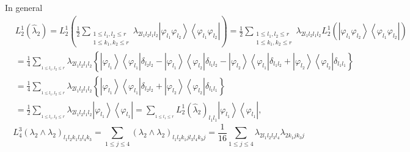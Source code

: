 \documentclass[aps,preprint]{revtex4}%
\begin{document}
In general%
\begin{align*}
&  L_{2}^{1}\left(  \hat{\lambda}_{2}\right)  =L_{2}^{1}\left(  \frac{1}%
{2}\sum_{\substack{1\leq l_{1},l_{2}\leq r\\1\leq k_{1},k_{2}\leq r}%
}\lambda_{2l_{1}l_{2}l_{1}l_{2}}\left\vert \varphi_{l_{1}}\varphi_{l_{2}%
}\right\rangle \left\langle \varphi_{l_{1}}\varphi_{l_{2}}\right\vert \right)
=\frac{1}{2}\sum_{\substack{1\leq l_{1},l_{2}\leq r\\1\leq k_{1},k_{2}\leq
r}}\lambda_{2l_{1}l_{2}l_{1}l_{2}}L_{2}^{1}\left(  \left\vert \varphi_{l_{1}%
}\varphi_{l_{2}}\right\rangle \left\langle \varphi_{l_{1}}\varphi_{l_{2}%
}\right\vert \right) \\
&  =\frac{1}{4}\sum_{_{1\leq l_{1},l_{2}\leq r}}\lambda_{2l_{1}l_{2}l_{1}%
l_{2}}\left\{  \left\vert \varphi_{l_{1}}\right\rangle \left\langle
\varphi_{l_{1}}\right\vert \delta_{l_{2}l_{2}}-\left\vert \varphi_{l_{1}%
}\right\rangle \left\langle \varphi_{l_{2}}\right\vert \delta_{l_{1}l_{2}%
}-\left\vert \varphi_{l_{2}}\right\rangle \left\langle \varphi_{l_{1}%
}\right\vert \delta_{l_{1}l_{2}}+\left\vert \varphi_{l_{2}}\right\rangle
\left\langle \varphi_{l_{2}}\right\vert \delta_{l_{1}l_{1}}\right\} \\
&  =\frac{1}{4}\sum_{_{1\leq l_{1},l_{2}\leq r}}\lambda_{2l_{1}l_{2}l_{1}%
l_{2}}\left\{  \left\vert \varphi_{l_{1}}\right\rangle \left\langle
\varphi_{l_{1}}\right\vert \delta_{l_{2}l_{2}}+\left\vert \varphi_{l_{2}%
}\right\rangle \left\langle \varphi_{l_{2}}\right\vert \delta_{l_{1}l_{1}%
}\right\} \\
&  =\frac{1}{2}\sum_{_{1\leq l_{1},l_{2}\leq r}}\lambda_{2l_{1}l_{2}l_{1}%
l_{2}}\left\vert \varphi_{l_{1}}\right\rangle \left\langle \varphi_{l_{1}%
}\right\vert =\sum_{_{1\leq l_{1}\leq r}}L_{2}^{1}\left(  \hat{\lambda}%
_{2}\right)  _{l_{1}l_{1}}\left\vert \varphi_{l_{1}}\right\rangle \left\langle
\varphi_{l_{1}}\right\vert ,
\end{align*}%
\begin{equation}
L_{4}^{3}\left(  \lambda_{2}\wedge\lambda_{2}\right)  _{l_{1}l_{2}k_{1}%
l_{3}l_{4}k_{3}}=\sum_{1\leq j\leq4}\left(  \lambda_{2}\wedge\lambda
_{2}\right)  _{l_{1}l_{2}k_{1}jl_{3}l_{4}k_{3}j}=\frac{1}{16}\sum_{1\leq
j\leq4}\lambda_{2l_{1}l_{2}l_{3}l_{4}}\lambda_{2k_{1}jk_{3}j}%
\end{equation}


\section{}
\end{document}
